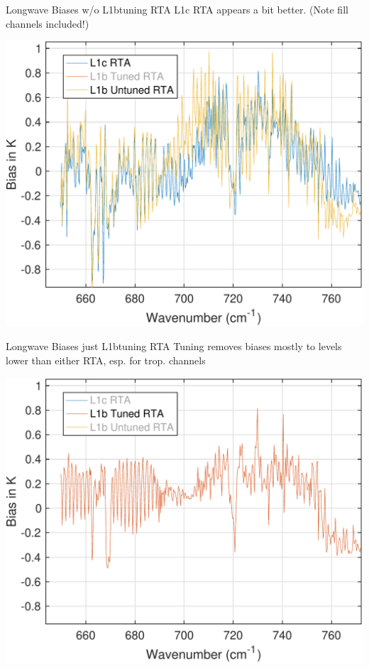 \documentclass[10pt,t]{beamer}
\begin{document}
\begin{frame}[label={sec:org87db84f}]{Longwave Biases w/o L1btuning RTA}
L1c RTA appears a bit better.  (Note fill channels included!)
\begin{center}
\includegraphics[width=0.75\linewidth]{./bias_3rta_lw_noL1btuning.pdf}
\end{center}
\end{frame}
\begin{frame}[label={sec:org2af980b}]{Longwave Biases just L1btuning RTA}
Tuning removes biases mostly to levels lower than either RTA, esp. for trop. channels
\begin{center}
\includegraphics[width=0.75\linewidth]{./bias_3rta_lw_justL1btuning.pdf}
\end{center}
\end{frame}
\end{document}
